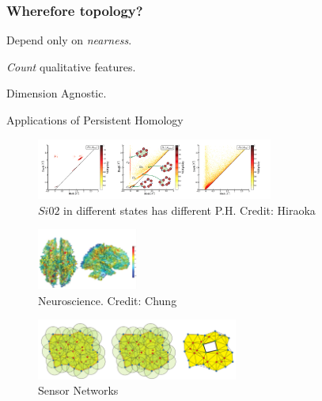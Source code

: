 \begin{frame}
  \frametitle{Wherefore topology? }
  \begin{minipage}{.25\textwidth}
  \end{minipage}
  \begin{minipage}{.65\textwidth}
  \begin{description}
      \item Depend only on \emph{nearness}. 
      \item \emph{Count} qualitative features.
      \item Dimension Agnostic.
      \end{description}
    \end{minipage}
    \vfill
\end{frame}

\begin{frame}{Applications of Persistent Homology}
\begin{center}
\begin{figure}
\includegraphics[height=2cm]{persistence_and_materials}
\caption{$Si02$ in different states has different P.H. Credit: Hiraoka}
\end{figure}
\end{center}
\begin{minipage}{.43\textwidth}
\begin{figure}
\includegraphics[height=2cm]{complex_on_brains}
\caption{Neuroscience. Credit: Chung}
\end{figure}
\end{minipage}
\begin{minipage}{.43\textwidth}
\hfill
\begin{figure}
\includegraphics[height=2cm]{sensors}
\caption{Sensor Networks}
\end{figure}
\vfill
\vspace{.5cm}
\end{minipage}
\end{frame}